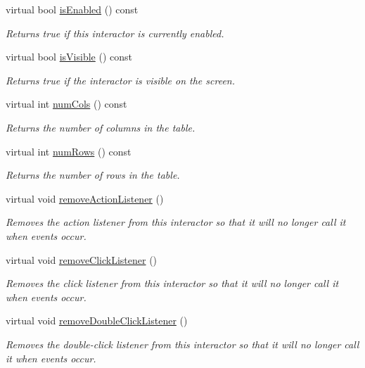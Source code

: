 \begin{DoxyCompactItemize}
virtual bool \mbox{\hyperlink{classsgl_1_1GInteractor_aacb819fb241851fd9fc045271baa4034}{is\+Enabled}} () const
\begin{DoxyCompactList}\small\item\em Returns true if this interactor is currently enabled. \end{DoxyCompactList}\item 
virtual bool \mbox{\hyperlink{classsgl_1_1GInteractor_a9d8a6cfb13917785c143e74d40e4e2be}{is\+Visible}} () const
\begin{DoxyCompactList}\small\item\em Returns true if the interactor is visible on the screen. \end{DoxyCompactList}\item 
virtual int \mbox{\hyperlink{classsgl_1_1GTable_a5997e103e56aae1db12e1f7f02e136c5}{num\+Cols}} () const
\begin{DoxyCompactList}\small\item\em Returns the number of columns in the table. \end{DoxyCompactList}\item 
virtual int \mbox{\hyperlink{classsgl_1_1GTable_a00b7e69dd5c43e42cc91db26c459ad8b}{num\+Rows}} () const
\begin{DoxyCompactList}\small\item\em Returns the number of rows in the table. \end{DoxyCompactList}\item 
virtual void \mbox{\hyperlink{classsgl_1_1GInteractor_ab7fe7a876367b87cf7202f947f1d05e4}{remove\+Action\+Listener}} ()
\begin{DoxyCompactList}\small\item\em Removes the action listener from this interactor so that it will no longer call it when events occur. \end{DoxyCompactList}\item 
virtual void \mbox{\hyperlink{classsgl_1_1GInteractor_ad39d0325cde6b97ebda4b9d7787c633b}{remove\+Click\+Listener}} ()
\begin{DoxyCompactList}\small\item\em Removes the click listener from this interactor so that it will no longer call it when events occur. \end{DoxyCompactList}\item 
virtual void \mbox{\hyperlink{classsgl_1_1GInteractor_aa4250907e4cdd77349c04f0cf5cdd3d3}{remove\+Double\+Click\+Listener}} ()
\begin{DoxyCompactList}\small\item\em Removes the double-\/click listener from this interactor so that it will no longer call it when events occur. \end{DoxyCompactList}\item 

\end{DoxyCompactItemize}
